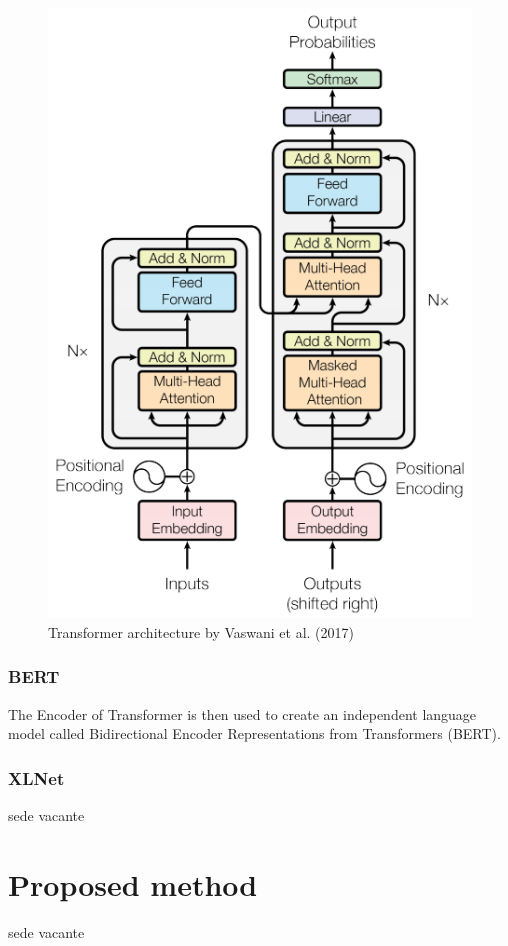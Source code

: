 \documentclass[pdflatex,sn-mathphys]{sn-jnl}%
\theoremstyle{thmstyleone}%
\theoremstyle{thmstyletwo}%
\theoremstyle{thmstylethree}%
\begin{document}
\begin{figure}[htp]
\centering
\includegraphics[scale=.5]{transformer.png}
\caption{Transformer architecture by Vaswani et al. (2017)\cite{Vaswani2017}}
\label{fig:transformer}
\end{figure}

\subsubsection{BERT}
The Encoder of Transformer is then used to create an independent language model called Bidirectional Encoder Representations from Transformers (BERT)\cite{Devlin2019}.

\subsubsection{XLNet}
sede vacante

\section{Proposed method}\label{proposedmethod}
sede vacante
\end{document}
